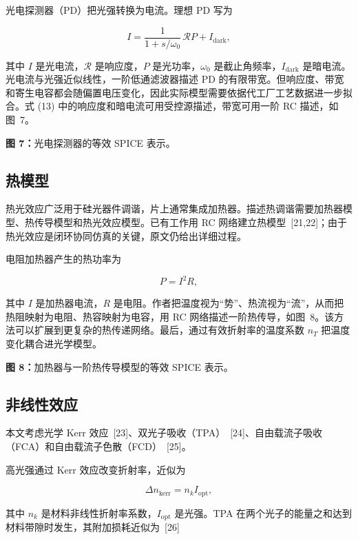\documentclass[11pt,a4paper]{ctexart}
\begin{document}
光电探测器（PD）把光强转换为电流。理想 PD 写为

\begin{equation}
I=\frac{1}{1+s/\omega_0}\,\mathcal{R}P+I_{\mathrm{dark}},
\tag{13}
\end{equation}

其中 $I$ 是光电流，$\mathcal{R}$ 是响应度，$P$ 是光功率，$\omega_0$ 是截止角频率，$I_{\mathrm{dark}}$ 是暗电流。光电流与光强近似线性，一阶低通滤波器描述 PD 的有限带宽。但响应度、带宽和寄生电容都会随偏置电压变化，因此实际模型需要依据代工厂工艺数据进一步拟合。式 (13) 中的响应度和暗电流可用受控源描述，带宽可用一阶 RC 描述，如图~7。

\noindent\textbf{图 7：}光电探测器的等效 SPICE 表示。

\subsection{热模型}

热光效应广泛用于硅光器件调谐，片上通常集成加热器。描述热调谐需要加热器模型、热传导模型和热光效应模型。已有工作用 RC 网络建立热模型~[21,22]；由于热光效应是闭环协同仿真的关键，原文仍给出详细过程。

电阻加热器产生的热功率为

\begin{equation}
P=I^2R,
\tag{14}
\end{equation}

其中 $I$ 是加热器电流，$R$ 是电阻。作者把温度视为“势”、热流视为“流”，从而把热阻映射为电阻、热容映射为电容，用 RC 网络描述一阶热传导，如图~8。该方法可以扩展到更复杂的热传递网络。最后，通过有效折射率的温度系数 $n_T$ 把温度变化耦合进光学模型。

\noindent\textbf{图 8：}加热器与一阶热传导模型的等效 SPICE 表示。

\subsection{非线性效应}

本文考虑光学 Kerr 效应~[23]、双光子吸收（TPA）~[24]、自由载流子吸收（FCA）和自由载流子色散（FCD）~[25]。

高光强通过 Kerr 效应改变折射率，近似为

\begin{equation}
\Delta n_{\mathrm{kerr}}=n_k I_{\mathrm{opt}},
\tag{15}
\end{equation}

其中 $n_k$ 是材料非线性折射率系数，$I_{\mathrm{opt}}$ 是光强。TPA 在两个光子的能量之和达到材料带隙时发生，其附加损耗近似为~[26]
\end{document}
